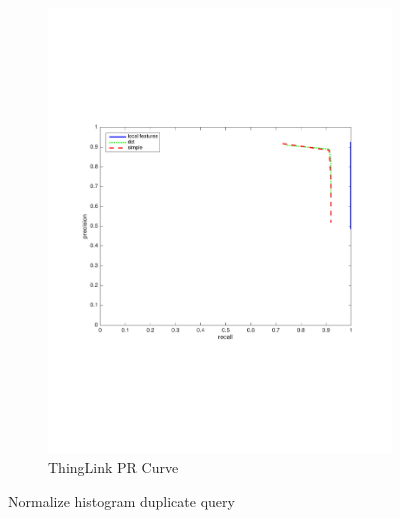 \documentclass[english,12pt,a4paper,pdftex,elec,utf8, table]{aaltothesis}
\begin{document}
\begin{figure}[htb]
\begin{center}
\begin{subfigure}[b]{0.49\textwidth}
    \includegraphics[width=\textwidth]{figures/thinglink_NormalizehistogramPR.pdf}
    \caption{ThingLink PR Curve}
    \label{Normalizeprthinglink}
  \end{subfigure}
  \caption{Normalize histogram duplicate query}
  \end{center}
\end{figure}
\end{document}
